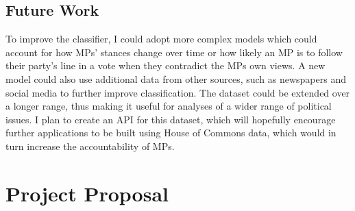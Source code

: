 \documentclass[12pt,a4paper,twoside,openright]{report}
\begin{document}
\section{Future Work}

To improve the classifier, I could adopt more complex models which could account for how MPs' stances change over time or how likely an MP is to follow their party's line in a vote when they contradict the MPs own views. A new model could also use additional data from other sources, such as newspapers and social media to further improve classification. The dataset could be extended over a longer range, thus making it useful for analyses of a wider range of political issues. I plan to create an API for this dataset, which will hopefully encourage further applications to be built using House of Commons data, which would in turn increase the accountability of MPs.

\appendix

\chapter{Project Proposal}
\label{sec:proposal}

\end{document}
